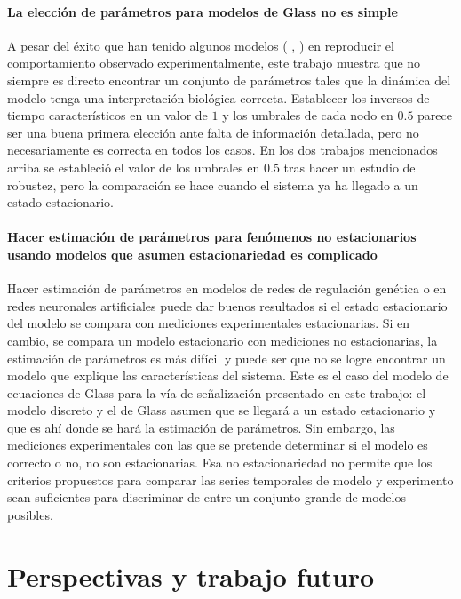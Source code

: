 \paragraph {La elección de parámetros para modelos de Glass no es simple} A pesar del éxito que han tenido algunos modelos (\citeauthor{AlvarezBuylla:2008cg} \citep{AlvarezBuylla:2008cg}, \citeauthor{Azpeitia:2010ik} \citep{Azpeitia:2010ik}) en reproducir el comportamiento observado experimentalmente, este trabajo muestra que no siempre es directo encontrar un conjunto de parámetros tales que la dinámica del modelo tenga una interpretación biológica correcta. Establecer los inversos de tiempo característicos en un valor de $1$ y los umbrales de cada nodo en $0.5$ parece ser una buena primera elección ante falta de información detallada, pero no necesariamente es correcta en todos los casos. En los dos trabajos mencionados arriba se estableció el valor de los umbrales en $0.5$ tras hacer un estudio de robustez, pero la comparación se hace cuando el sistema ya ha llegado a un estado estacionario.

\paragraph {Hacer estimación de parámetros para fenómenos no estacionarios usando modelos que asumen estacionariedad es complicado} Hacer estimación de parámetros en modelos de redes de regulación genética o en redes neuronales artificiales puede dar buenos resultados si el estado estacionario del modelo se compara con mediciones experimentales estacionarias. Si en cambio, se compara un modelo estacionario con mediciones no estacionarias, la estimación de parámetros es más difícil y puede ser que no se logre encontrar un modelo que explique las características del sistema. Este es el caso del modelo de ecuaciones de Glass para la vía de señalización presentado en este trabajo: el modelo discreto y el de Glass asumen que se llegará a un estado estacionario y que es ahí donde se hará la estimación de parámetros. Sin embargo, las mediciones experimentales con las que se pretende determinar si el modelo es correcto o no, no son estacionarias. Esa no estacionariedad no permite que los criterios propuestos para comparar las series temporales de modelo y experimento sean suficientes para discriminar de entre un conjunto grande de modelos posibles.

\section{Perspectivas y trabajo futuro}

